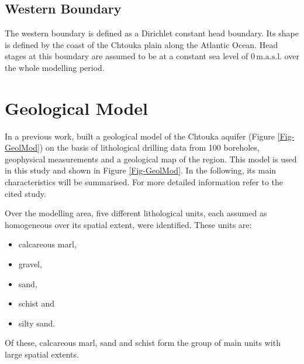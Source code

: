 \subsection{Western Boundary}

The western boundary is defined as a Dirichlet constant head boundary. Its shape is defined by the coast of the Chtouka plain along the Atlantic Ocean. Head stages at this boundary are assumed to be at a constant sea level of $0 \, \textrm{m.a.s.l.}$ over the whole modelling period.


\section{Geological Model}
\label{Sec-GeolModel}

In a previous work, \cite{Horn.2021} built a geological model of the Chtouka aquifer (Figure \ref{Fig-GeolMod}) on the basis of lithological drilling data from 100 boreholes, geophysical measurements and a geological map of the region. This model is used in this study and shown in Figure \ref{Fig-GeolMod}. In the following, its main characteristics will be summarised. For more detailed information refer to the cited study.

Over the modelling area, five different lithological units, each assumed as homogeneous over its spatial extent, were identified. These units are:

\begin{itemize}
    \item calcareous marl,
    \item gravel,
    \item sand,
    \item schist and
    \item silty sand.
\end{itemize}

Of these, calcareous marl, sand and schist form the group of main units with large spatial extents. 

